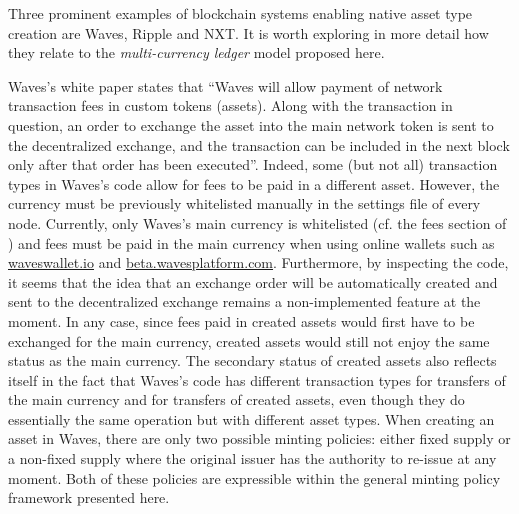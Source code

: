 \documentclass{llncs}
\begin{document}
Three prominent examples of blockchain systems enabling native asset type creation are Waves, Ripple and NXT. It is worth exploring in more detail how they relate to the \emph{multi-currency ledger} model proposed here. 

Waves's white paper \cite{Waves} states that ``Waves will allow payment of network transaction fees in custom tokens (assets). Along with the transaction in question, an order to exchange the asset into the main network token is sent to the decentralized exchange, and the transaction can be included in the next block only after that order has been executed''. Indeed, some (but not all) transaction types in Waves's code allow for fees to be paid in a different asset. However, the currency must be previously whitelisted manually in the settings file of every node. Currently, only Waves's main currency is whitelisted (cf. the fees section of \cite{WavesCodeApplicationConf}) and fees must be paid in the main currency when using online wallets such as \url{waveswallet.io} and \url{beta.wavesplatform.com}. Furthermore, by inspecting the code, it seems that the idea that an exchange order will be automatically created and sent to the decentralized exchange remains a non-implemented feature at the moment. In any case, since fees paid in created assets would first have to be exchanged for the main currency, created assets would still not enjoy the same status as the main currency. The secondary status of created assets also reflects itself in the fact that Waves's code has different transaction types for transfers of the main currency and for transfers of created assets, even though they do essentially the same operation but with different asset types. When creating an asset in Waves, there are only two possible minting policies: either fixed supply or a non-fixed supply where the original issuer has the authority to re-issue at any moment. Both of these policies are expressible within the general minting policy framework presented here.
\end{document}
